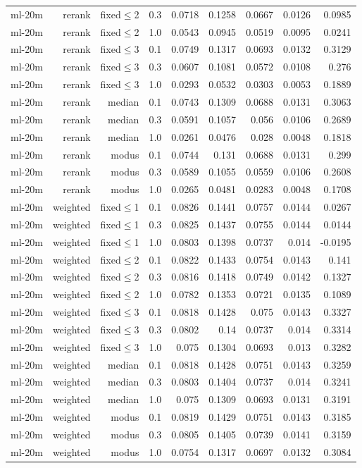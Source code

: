 \begin{longtable}{lrrrrrrrr}
ml-20m & rerank & fixed$\leq$2 & 0.3 & 0.0718 & 0.1258 & 0.0667 & 0.0126 & 0.0985 \\
ml-20m & rerank & fixed$\leq$2 & 1.0 & 0.0543 & 0.0945 & 0.0519 & 0.0095 & 0.0241 \\
ml-20m & rerank & fixed$\leq$3 & 0.1 & 0.0749 & 0.1317 & 0.0693 & 0.0132 & 0.3129 \\
ml-20m & rerank & fixed$\leq$3 & 0.3 & 0.0607 & 0.1081 & 0.0572 & 0.0108 & 0.276 \\
ml-20m & rerank & fixed$\leq$3 & 1.0 & 0.0293 & 0.0532 & 0.0303 & 0.0053 & 0.1889 \\
ml-20m & rerank & median & 0.1 & 0.0743 & 0.1309 & 0.0688 & 0.0131 & 0.3063 \\
ml-20m & rerank & median & 0.3 & 0.0591 & 0.1057 & 0.056 & 0.0106 & 0.2689 \\
ml-20m & rerank & median & 1.0 & 0.0261 & 0.0476 & 0.028 & 0.0048 & 0.1818 \\
ml-20m & rerank & modus & 0.1 & 0.0744 & 0.131 & 0.0688 & 0.0131 & 0.299 \\
ml-20m & rerank & modus & 0.3 & 0.0589 & 0.1055 & 0.0559 & 0.0106 & 0.2608 \\
ml-20m & rerank & modus & 1.0 & 0.0265 & 0.0481 & 0.0283 & 0.0048 & 0.1708 \\
ml-20m & weighted & fixed$\leq$1 & 0.1 & 0.0826 & 0.1441 & 0.0757 & 0.0144 & 0.0267 \\
ml-20m & weighted & fixed$\leq$1 & 0.3 & 0.0825 & 0.1437 & 0.0755 & 0.0144 & 0.0144 \\
ml-20m & weighted & fixed$\leq$1 & 1.0 & 0.0803 & 0.1398 & 0.0737 & 0.014 & -0.0195 \\
ml-20m & weighted & fixed$\leq$2 & 0.1 & 0.0822 & 0.1433 & 0.0754 & 0.0143 & 0.141 \\
ml-20m & weighted & fixed$\leq$2 & 0.3 & 0.0816 & 0.1418 & 0.0749 & 0.0142 & 0.1327 \\
ml-20m & weighted & fixed$\leq$2 & 1.0 & 0.0782 & 0.1353 & 0.0721 & 0.0135 & 0.1089 \\
ml-20m & weighted & fixed$\leq$3 & 0.1 & 0.0818 & 0.1428 & 0.075 & 0.0143 & 0.3327 \\
ml-20m & weighted & fixed$\leq$3 & 0.3 & 0.0802 & 0.14 & 0.0737 & 0.014 & 0.3314 \\
ml-20m & weighted & fixed$\leq$3 & 1.0 & 0.075 & 0.1304 & 0.0693 & 0.013 & 0.3282 \\
ml-20m & weighted & median & 0.1 & 0.0818 & 0.1428 & 0.0751 & 0.0143 & 0.3259 \\
ml-20m & weighted & median & 0.3 & 0.0803 & 0.1404 & 0.0737 & 0.014 & 0.3241 \\
ml-20m & weighted & median & 1.0 & 0.075 & 0.1309 & 0.0693 & 0.0131 & 0.3191 \\
ml-20m & weighted & modus & 0.1 & 0.0819 & 0.1429 & 0.0751 & 0.0143 & 0.3185 \\
ml-20m & weighted & modus & 0.3 & 0.0805 & 0.1405 & 0.0739 & 0.0141 & 0.3159 \\
ml-20m & weighted & modus & 1.0 & 0.0754 & 0.1317 & 0.0697 & 0.0132 & 0.3084 \\
\end{longtable}